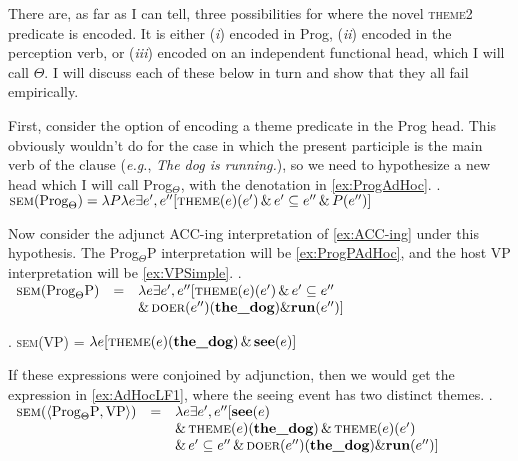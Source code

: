 \documentclass[MilwayThesis]{subfiles}
\begin{document}
There are, as far as I can tell, three possibilities for where the novel \textsc{theme2} predicate is encoded.
It is either (\textit{i}) encoded in Prog, (\textit{ii}) encoded in the perception verb, or (\textit{iii}) encoded on an independent functional head, which I will call $\Theta$.
I will discuss each of these below in turn and show that they all fail empirically.

First, consider the option of encoding a theme predicate in the Prog head.
This obviously wouldn't do for the case in which the present participle is the main verb of the clause (\textit{e.g.}, \textit{The dog is running.}), so we need to hypothesize a new head which I will call Prog$_{\Theta}$, with the denotation in \cref{ex:ProgAdHoc}.
\ex.\label{ex:ProgAdHoc} $\textsc{sem}(\text{Prog}_{\Theta}) = \lambda P \lambda e \exists e^{\prime},e^{\prime\prime}[\textsc{theme}(e)(e^{\prime}) \,\&\, e^{\prime}\subseteq e^{\prime\prime} \,\&\, P(e^{\prime\prime})]$

Now consider the adjunct ACC-ing interpretation of \cref{ex:ACC-ing} under this hypothesis.
The Prog$_{\Theta}$P interpretation will be \cref{ex:ProgPAdHoc}, and the host VP interpretation will be \cref{ex:VPSimple}.
\ex.\label{ex:ProgPAdHoc} $
\begin{array}[t]{rcl}
	\textsc{sem}(\text{Prog}_{\Theta}\text{P}) &=& \lambda e \exists e^{\prime},e^{\prime\prime}[\textsc{theme}(e)(e^{\prime}) \,\&\, e^{\prime}\subseteq e^{\prime\prime}\\
	& & \&\, \textsc{doer}(e^{\prime\prime})(\textbf{the\_dog}) \& \textbf{run}(e^{\prime\prime})]
\end{array}
$

\ex.\label{ex:VPSimple} \textsc{sem}(VP) = $\lambda e [\textsc{theme}(e)(\textbf{the\_dog}) \,\&\, \textbf{see}(e)]$

If these expressions were conjoined by adjunction, then we would get the expression in \cref{ex:AdHocLF1}, where the seeing event has two distinct themes.
\ex.\label{ex:AdHocLF1} $
\begin{array}[t]{rcl}
	\textsc{sem}(\langle \text{Prog}_{\Theta}\text{P}, \text{VP}\rangle) &=& \lambda e\exists e^{\prime},e^{\prime\prime}[\textbf{see}(e)\\
		& & \&\, \textsc{theme}(e)(\textbf{the\_dog}) \,\&\, \textsc{theme}(e)(e^{\prime})\\
	& & \&\, e^{\prime}\subseteq e^{\prime\prime} \,\&\, \textsc{doer}(e^{\prime\prime})(\textbf{the\_dog}) \& \textbf{run}(e^{\prime\prime})]
\end{array}
$
\end{document}
